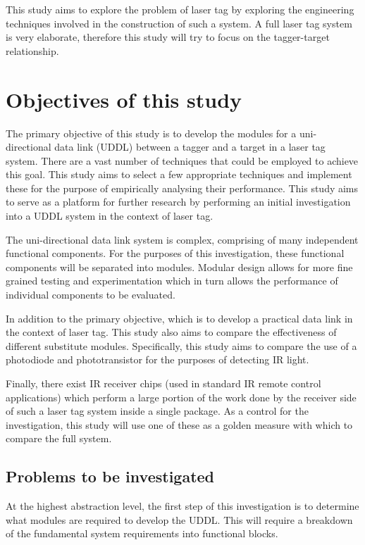 This study aims to explore the problem of laser tag by exploring the engineering techniques involved in the construction of such a system. A full laser tag system is very elaborate, therefore this study will try to focus on the tagger-target relationship.

\section{Objectives of this study}

The primary objective of this study is to develop the modules for a uni-directional data link (UDDL) between a tagger and a target in a laser tag system. There are a vast number of techniques that could be employed to achieve this goal. This study aims to select a few appropriate techniques and implement these for the purpose of empirically analysing their performance. This study aims to serve as a platform for further research by performing an initial investigation into a UDDL system in the context of laser tag.

The uni-directional data link system is complex, comprising of many independent functional components. For the purposes of this investigation, these functional components will be separated into modules. Modular design allows for more fine grained testing and experimentation which in turn allows the performance of individual components to be evaluated.

In addition to the primary objective, which is to develop a practical data link in the context of laser tag. This study also aims to compare the effectiveness of different substitute modules. Specifically, this study aims to compare the use of a photodiode and phototransistor for the purposes of detecting IR light.

Finally, there exist IR receiver chips (used in standard IR remote control applications) which perform a large portion of the work done by the receiver side of such a laser tag system inside a single package. As a control for the investigation, this study will use one of these as a golden measure with which to compare the full system.

\subsection{Problems to be investigated}

At the highest abstraction level, the first step of this investigation is to determine what modules are required to develop the UDDL. This will require a breakdown of the fundamental system requirements into functional blocks.

